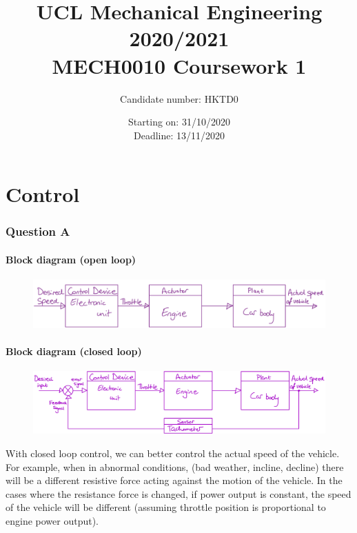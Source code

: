 \documentclass[12pt]{article}
\numberwithin{equation}{section}
\begin{document}
\title{\textbf{UCL Mechanical Engineering 2020/2021}\\MECH0010 Coursework 1}
\date{Starting on: 31/10/2020\\Deadline: 13/11/2020}
\author{Candidate number: HKTD0}
\maketitle
\tableofcontents
\newpage
\part{Control}
\section{Question A}
\subsection*{Block diagram (open loop)}
\begin{figure}[H]
  \centering
  \includegraphics[width=\textwidth]{./img/1-1blockdiagram.png}
\end{figure}
\subsection*{Block diagram (closed loop)}
\begin{figure}[H]
  \centering
  \includegraphics[width=\textwidth]{./img/1-2blockdiagram.png}
\end{figure}
With closed loop control, we can better control the actual speed of the vehicle. For example, when in abnormal conditions, (bad weather, incline, decline) there will be a different resistive force acting against the motion of the vehicle. In the cases where the resistance force is changed, if power output is constant, the speed of the vehicle will be different (assuming throttle position is proportional to engine power output). 
\end{document}
